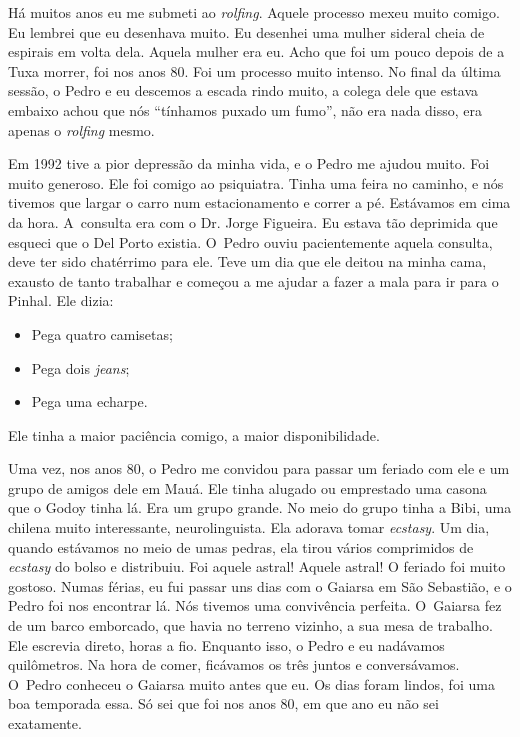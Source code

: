 Há muitos anos eu me submeti ao \emph{rolfing}. Aquele processo
mexeu muito comigo. Eu lembrei que eu desenhava muito. Eu desenhei uma
mulher sideral cheia de espirais em volta dela. Aquela mulher era eu.
Acho que foi um pouco depois de a Tuxa morrer, foi nos anos 80. Foi um
processo muito intenso. No final da última sessão, o Pedro e eu descemos
a escada rindo muito, a colega dele que estava embaixo achou que nós
``tínhamos puxado um fumo'', não era nada disso, era apenas o
\emph{rolfing} mesmo.

Em 1992 tive a pior depressão da minha vida, e o Pedro me ajudou muito.
Foi muito generoso. Ele foi comigo ao psiquiatra. Tinha uma feira no
caminho, e nós tivemos que largar o carro num estacionamento e correr a
pé. Estávamos em cima da hora. A~consulta era com o Dr. Jorge Figueira.
Eu estava tão deprimida que esqueci que o Del Porto existia. O~Pedro
ouviu pacientemente aquela consulta, deve ter sido chatérrimo para ele.
Teve um dia que ele deitou na minha cama, exausto de tanto trabalhar e
começou a me ajudar a fazer a mala para ir para o Pinhal. Ele dizia:

\begin{itemize}
\item
  Pega quatro camisetas;
\item
  Pega dois \emph{jeans};
\item
  Pega uma echarpe.
\end{itemize}
Ele tinha a maior paciência comigo, a maior disponibilidade.

Uma vez, nos anos 80, o Pedro me convidou para passar um feriado com ele
e um grupo de amigos dele em Mauá. Ele tinha alugado ou emprestado uma
casona que o Godoy tinha lá. Era um grupo grande. No meio do grupo tinha
a Bibi, uma chilena muito interessante, neurolinguista. Ela adorava
tomar \emph{ecstasy}. Um dia, quando estávamos no meio de umas pedras,
ela tirou vários comprimidos de \emph{ecstasy} do bolso e distribuiu.
Foi aquele astral! Aquele astral! O feriado foi muito gostoso. Numas
férias, eu fui passar uns dias com o Gaiarsa em São Sebastião, e o Pedro
foi nos encontrar lá. Nós tivemos uma convivência perfeita. O~Gaiarsa
fez de um barco emborcado, que havia no terreno vizinho, a sua mesa de
trabalho. Ele escrevia direto, horas a fio. Enquanto isso, o Pedro e eu
nadávamos quilômetros. Na hora de comer, ficávamos os três juntos e
conversávamos. O~Pedro conheceu o Gaiarsa muito antes que eu. Os dias
foram lindos, foi uma boa temporada essa. Só sei que foi nos anos 80, em
que ano eu não sei exatamente.


